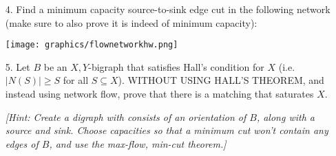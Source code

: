 \documentclass[12pt]{article}
\begin{document}
\begin{enumerate}
\item[4.] Find a minimum capacity source-to-sink edge cut in the following network (make sure to also prove it is indeed of minimum capacity):
\begin{center}
	\texttt{[image: graphics/flownetworkhw.png]}
\end{center}

\item[5.] Let $B$ be an $X,Y$-bigraph that satisfies Hall's condition for $X$ (i.e. $|N(S)|\geq S$ for all $S\subseteq X$). WITHOUT USING HALL'S THEOREM, and instead using network flow, prove that there is a matching that saturates $X$.

\emph{[Hint: Create a digraph with consists of an orientation of $B$, along with a source and sink. Choose capacities so that a minimum cut won't contain any edges of $B$, and use the max-flow, min-cut theorem.]}

\end{enumerate}
\end{document}
